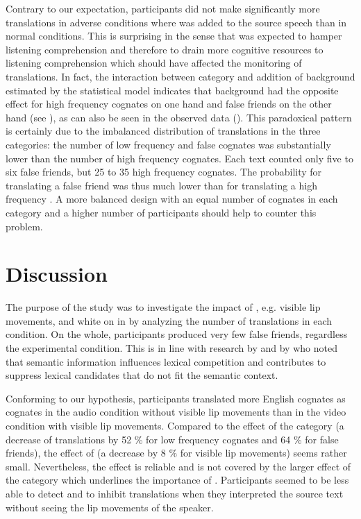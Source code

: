 \documentclass[output=paper]{LSP/langsci}
\begin{document}
Contrary to our expectation, participants did not make significantly more  translations in adverse  conditions where  was added to the source speech than in normal  conditions. This is surprising in the sense that  was expected to hamper listening comprehension and therefore to drain more cognitive resources to listening comprehension which should have affected the monitoring of  translations. In fact, the interaction between  category and addition of background  estimated by the statistical model indicates that background  had the opposite effect for high frequency cognates on one hand and false friends on the other hand (see ), as can also be seen in the observed data (). This paradoxical pattern is certainly due to the imbalanced distribution of  translations in the three categories: the number of low frequency and false cognates was substantially lower than the number of high frequency cognates. Each text counted only five to six false friends, but 25 to 35 high frequency cognates. The probability for translating a false friend was thus much lower than for translating a high frequency . A more balanced design with an equal number of cognates in each category and a higher number of participants should help to counter this problem. 



\section{Discussion}

The purpose of the study was to investigate the impact of , e.g. visible lip movements, and white  on  in  by analyzing the number of  translations in each condition. On the whole, participants produced very few false friends, regardless the experimental condition. This is in line with research by \citet{vanAssche2011} and by \citet{Schwartz2006} who noted that semantic information influences lexical competition and contributes to suppress lexical candidates that do not fit the semantic context.

Conforming to our hypothesis, participants translated more English cognates as  cognates in the audio condition without visible lip movements than in the video condition with visible lip movements. Compared to the effect of the  category (a decrease of  translations by 52 \% for low frequency cognates and 64 \% for false friends), the effect of  (a decrease by 8 \% for visible lip movements) seems rather small. Nevertheless, the effect is reliable and is not covered by the larger effect of the  category which underlines the importance of . Participants seemed to be less able to detect and to inhibit  translations when they interpreted the source text without seeing the lip movements of the speaker. 
\end{document}
